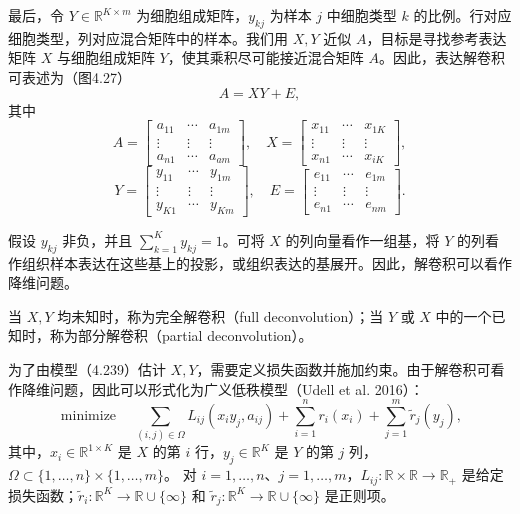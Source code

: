 最后，令 $Y\in\mathbb R^{K\times m}$ 为细胞组成矩阵，$y_{kj}$ 为样本 $j$ 中细胞类型 $k$ 的比例。行对应细胞类型，列对应混合矩阵中的样本。我们用 $X,Y$ 近似 $A$，目标是寻找参考表达矩阵 $X$ 与细胞组成矩阵 $Y$，使其乘积尽可能接近混合矩阵 $A$。因此，表达解卷积可表述为（图4.27）
\begin{equation}
A=XY+E,\tag{4.239}
\end{equation}
其中
\[
A=\begin{bmatrix}a_{11}&\cdots&a_{1m}\\\vdots&\vdots&\vdots\\a_{n1}&\cdots&a_{am}\end{bmatrix},\quad
X=\begin{bmatrix}x_{11}&\cdots&x_{1K}\\\vdots&\vdots&\vdots\\x_{n1}&\cdots&x_{iK}\end{bmatrix},
\]
\[
Y=\begin{bmatrix}y_{11}&\cdots&y_{1m}\\\vdots&\vdots&\vdots\\y_{K1}&\cdots&y_{Km}\end{bmatrix},\quad
E=\begin{bmatrix}e_{11}&\cdots&e_{1m}\\\vdots&\vdots&\vdots\\e_{n1}&\cdots&e_{nm}\end{bmatrix}.
\]
\begin{figure}[htbp]
\centering
\resizebox{.98\linewidth}{!}{}
\end{figure}
假设 $y_{kj}$ 非负，并且 $\sum_{k=1}^{K}y_{kj}=1$。可将 $X$ 的列向量看作一组基，将 $Y$ 的列看作组织样本表达在这些基上的投影，或组织表达的基展开。因此，解卷积可以看作降维问题。

当 $X,Y$ 均未知时，称为完全解卷积（full deconvolution）；当 $Y$ 或 $X$ 中的一个已知时，称为部分解卷积（partial deconvolution）。

为了由模型（4.239）估计 $X,Y$，需要定义损失函数并施加约束。由于解卷积可看作降维问题，因此可以形式化为广义低秩模型（Udell et al. 2016）：
\begin{equation}
\operatorname{minimize}\quad
\sum_{(i,j)\in\Omega}L_{ij}(x_iy_j,a_{ij})
+\sum_{i=1}^{n}r_i(x_i)+\sum_{j=1}^{m}\widetilde r_j(y_j),\tag{4.240}
\end{equation}
其中，$x_i\in\mathbb R^{1\times K}$ 是 $X$ 的第 $i$ 行，$y_j\in\mathbb R^K$ 是 $Y$ 的第 $j$ 列，$\Omega\subset\{1,\ldots,n\}\times\{1,\ldots,m\}$。
对 $i=1,\ldots,n$、$j=1,\ldots,m$，$L_{ij}:\mathbb R\times\mathbb R\to\mathbb R_+$ 是给定损失函数；$\widetilde r_i:\mathbb R^K\to\mathbb R\cup\{\infty\}$ 和 $\widetilde r_j:\mathbb R^K\to\mathbb R\cup\{\infty\}$ 是正则项。


